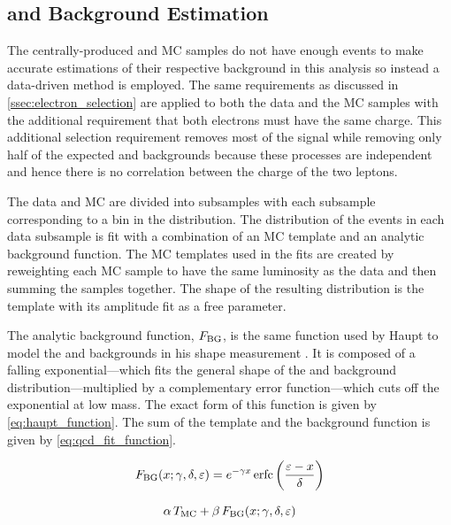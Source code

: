 \subsection{\texorpdfstring{\QCDjets and \wjets}{QCD multi-jet and W+Jets} Background Estimation}
\label{ssec:qcd_background}

The centrally-produced \QCDjets and \wjets MC samples do not have enough events
to make accurate estimations of their respective background in this analysis so
instead a data-driven method is employed. The same requirements as discussed in
\cref{ssec:electron_selection} are applied to both the data and the MC
samples with the additional requirement that both electrons must have the same
charge. This additional selection requirement removes most of the signal while
removing only half of the expected \QCDjets and \wjets backgrounds because
these processes are independent and hence there is no correlation between the
charge of the two leptons.

The data and MC are divided into subsamples with each subsample corresponding
to a bin in the \phistar distribution. The \mee distribution of the events in
each data subsample is fit with a combination of an MC template and an analytic
background function. The MC templates used in the fits are created by
reweighting each MC sample to have the same luminosity as the data and then
summing the samples together. The shape of the resulting distribution is the
template with its amplitude fit as a free parameter.

The analytic background function, $F_{\text{BG}}$, is the same function used by
Haupt to model the \QCDjets and \wjets backgrounds in his \Ztoee shape
measurement \cite{haupt_2011}. It is composed of a falling exponential---which
fits the general shape of the \QCDjets and \wjets background
distribution---multiplied by a complementary error function---which cuts off
the exponential at low mass. The exact form of this function is given by
\cref{eq:haupt_function}. The sum of the template and the background
function is given by \cref{eq:qcd_fit_function}.

\begin{equation}\label{eq:haupt_function}
    F_{\text{BG}}(x; \gamma, \delta, \varepsilon) = e^{- \gamma x} \operatorname{erfc} \left( \frac{\varepsilon - x}{\delta} \right)
\end{equation}

\begin{equation}\label{eq:qcd_fit_function}
    \alpha \, T_{\text{MC}} + \beta \, F_{\text{BG}}(x; \gamma, \delta, \varepsilon)
\end{equation}

